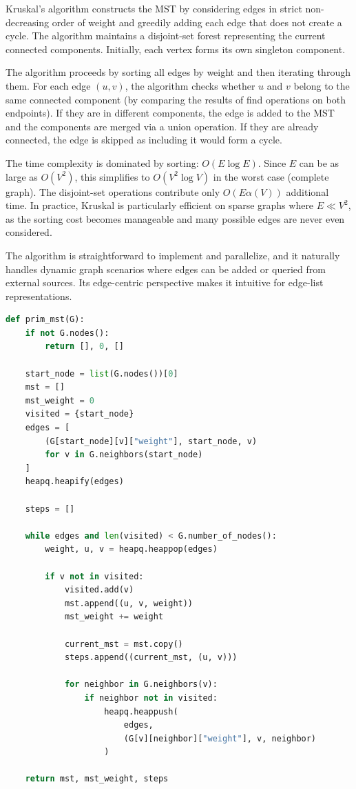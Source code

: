 ﻿\documentclass[12pt]{article}
\begin{document}
Kruskal's algorithm constructs the MST by considering edges in strict non-decreasing order of weight and greedily adding each edge that does not create a cycle. The algorithm maintains a disjoint-set forest representing the current connected components. Initially, each vertex forms its own singleton component.

The algorithm proceeds by sorting all edges by weight and then iterating through them. For each edge $(u, v)$, the algorithm checks whether $u$ and $v$ belong to the same connected component (by comparing the results of find operations on both endpoints). If they are in different components, the edge is added to the MST and the components are merged via a union operation. If they are already connected, the edge is skipped as including it would form a cycle.

The time complexity is dominated by sorting: $O(E \log E)$. Since $E$ can be as large as $O(V^2)$, this simplifies to $O(V^2 \log V)$ in the worst case (complete graph). The disjoint-set operations contribute only $O(E \alpha(V))$ additional time. In practice, Kruskal is particularly efficient on sparse graphs where $E \ll V^2$, as the sorting cost becomes manageable and many possible edges are never even considered.

The algorithm is straightforward to implement and parallelize, and it naturally handles dynamic graph scenarios where edges can be added or queried from external sources. Its edge-centric perspective makes it intuitive for edge-list representations.

\begin{lstlisting}[language=Python, caption={Prim's Algorithm (impl.py)}, label={lst:prim-py}]
def prim_mst(G):
    if not G.nodes():
        return [], 0, []
    
    start_node = list(G.nodes())[0]
    mst = []
    mst_weight = 0
    visited = {start_node}
    edges = [
        (G[start_node][v]["weight"], start_node, v) 
        for v in G.neighbors(start_node)
    ]
    heapq.heapify(edges)
    
    steps = []
    
    while edges and len(visited) < G.number_of_nodes():
        weight, u, v = heapq.heappop(edges)
        
        if v not in visited:
            visited.add(v)
            mst.append((u, v, weight))
            mst_weight += weight
            
            current_mst = mst.copy()
            steps.append((current_mst, (u, v)))
            
            for neighbor in G.neighbors(v):
                if neighbor not in visited:
                    heapq.heappush(
                        edges, 
                        (G[v][neighbor]["weight"], v, neighbor)
                    )
    
    return mst, mst_weight, steps
\end{lstlisting}
\end{document}
